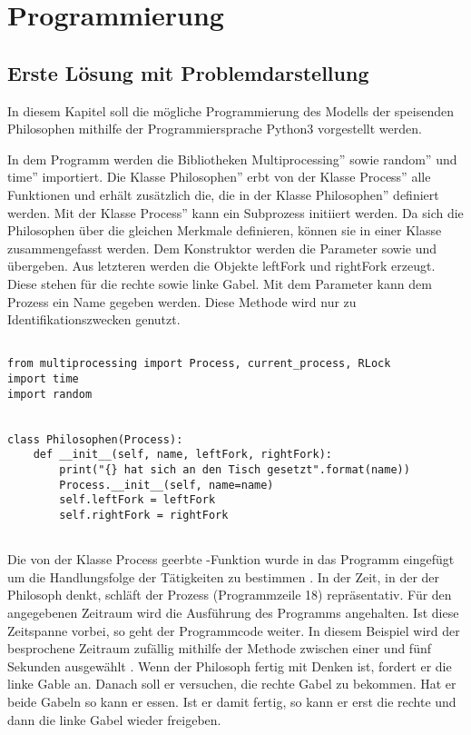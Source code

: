 \chapter{Programmierung}
\label{programmierung}
\section{Erste Lösung mit Problemdarstellung}
\label{erste_lösung}

In diesem Kapitel soll die mögliche Programmierung des Modells der speisenden Philosophen mithilfe der Programmiersprache Python3 vorgestellt werden.

In dem Programm werden die Bibliotheken \glqq Multiprocessing'' sowie \glqq random'' und \glqq time'' importiert. Die Klasse \glqq Philosophen'' erbt von der Klasse \glqq Process'' alle Funktionen und erhält zusätzlich die, die in der Klasse \glqq Philosophen'' definiert werden. Mit der Klasse \glqq Process'' kann ein Subprozess initiiert werden. Da sich die Philosophen über die gleichen Merkmale definieren, können sie in einer Klasse zusammengefasst werden. Dem Konstruktor werden die Parameter  sowie  und   übergeben. Aus letzteren werden die Objekte leftFork und rightFork erzeugt. Diese stehen für die rechte sowie linke Gabel. Mit dem Parameter  kann dem Prozess ein Name gegeben werden. \glqq Diese Methode wird nur zu Identifikationszwecken genutzt\grqq \parencite{lock}.

\begin{lstlisting}[style = Python, label = {erste Lösung}, caption = {Klasse Philosophen}]

from multiprocessing import Process, current_process, RLock
import time
import random


class Philosophen(Process):
    def __init__(self, name, leftFork, rightFork):
        print("{} hat sich an den Tisch gesetzt".format(name))
        Process.__init__(self, name=name)
        self.leftFork = leftFork
        self.rightFork = rightFork
        
\end{lstlisting}

Die von der Klasse \glqq Process \grqq geerbte  -Funktion wurde in das Programm eingefügt um die Handlungsfolge der Tätigkeiten zu bestimmen \parencite[vgl.]{lock} . In der Zeit, in der der Philosoph denkt, schläft der Prozess (Programmzeile 18) repräsentativ. Für den angegebenen Zeitraum wird die Ausführung des Programms angehalten. Ist diese Zeitspanne vorbei, so geht der Programmcode weiter. In diesem Beispiel wird der besprochene Zeitraum zufällig mithilfe der  Methode zwischen einer und fünf Sekunden ausgewählt \parencite[vgl.]{sleep}. Wenn der Philosoph fertig mit Denken ist, fordert er die linke Gable an. Danach soll er versuchen, die rechte Gabel zu bekommen. Hat er beide Gabeln so kann er essen. Ist er damit fertig, so kann er erst die rechte und dann die linke Gabel wieder freigeben.

